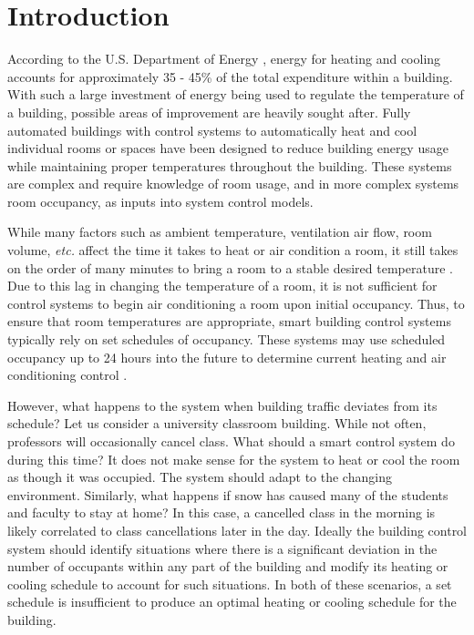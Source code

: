 \chapter{Introduction}
According to the U.S. Department of Energy \cite{DOE2010}, energy for heating and cooling accounts for approximately 35 - 45\% of the total expenditure within a building.  With such a large investment of energy being used to regulate the temperature of a building, possible areas of improvement are heavily sought after.  Fully automated buildings with control systems to automatically heat and cool individual rooms or spaces have been designed \cite{Controls2013, Controls2013a} to reduce building energy usage while maintaining proper temperatures throughout the building.  These systems are complex and require knowledge of room usage, and in more complex systems room occupancy, as inputs into system control models.
	
While many factors such as ambient temperature, ventilation air flow, room volume, \textit{etc.} affect the time it takes to heat or air condition a room, it still takes on the order of many minutes to bring a room to a stable desired temperature \cite{yang2004}.  Due to this lag in changing the temperature of a room, it is not sufficient for control systems to begin air conditioning a room upon initial occupancy.   Thus, to ensure that room temperatures are appropriate, smart building control systems typically rely on set schedules of occupancy.  These systems may use scheduled occupancy up to 24 hours into the future to determine current heating and air conditioning control \cite{Ma2010}.  

However, what happens to the system when building traffic deviates from its schedule?  Let us consider a university classroom building.  While not often, professors will occasionally cancel class.  What should a smart control system do during this time?  It does not make sense for the system to heat or cool the room as though it was occupied.  The system should adapt to the changing environment.  Similarly, what happens if snow has caused many of the students and faculty to stay at home?  In this case, a cancelled class in the morning is likely correlated to class cancellations later in the day.  Ideally the building control system should identify situations where there is a significant deviation in the number of occupants within any part of the building and modify its heating or cooling schedule to account for such situations.  In both of these scenarios, a set schedule is insufficient to produce an optimal heating or cooling schedule for the building.

